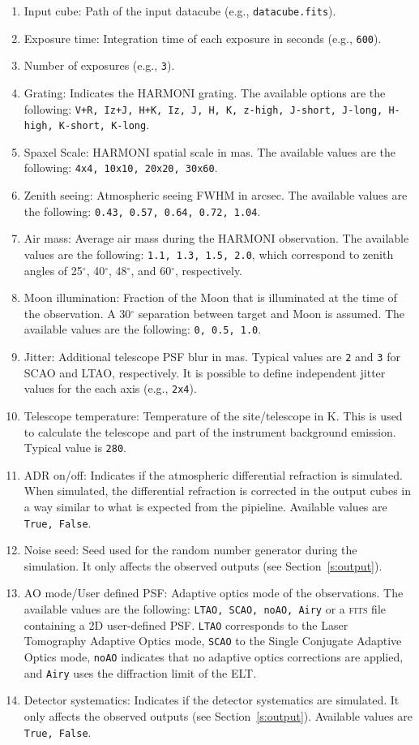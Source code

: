 \documentclass[12pt]{report}
\begin{document}
\begin{enumerate}
\setlength\itemsep{-0.5ex}
\item Input cube: Path of the input datacube (e.g., \texttt{datacube.fits}).
\item Exposure time: Integration time of each exposure in seconds (e.g., \texttt{600}).
\item Number of exposures (e.g., \texttt{3}).
\item Grating: Indicates the HARMONI grating. The available options are the following: \texttt{V+R, Iz+J, H+K, Iz, J, H, K, z-high, J-short, J-long, H-high, K-short, K-long}.
\item Spaxel Scale: HARMONI spatial scale in mas. The available values are the following: \texttt{4x4, 10x10, 20x20, 30x60}.
\item Zenith seeing: Atmospheric seeing FWHM in arcsec. The available values are the following: \texttt{0.43, 0.57, 0.64, 0.72, 1.04}.
\item Air mass: Average air mass during the HARMONI observation. The available values are the following: \texttt{1.1, 1.3, 1.5, 2.0}, which correspond to zenith angles of 25$^{\circ}$, 40$^{\circ}$, 48$^{\circ}$, and 60$^{\circ}$, respectively.
\item Moon illumination: Fraction of the Moon that is illuminated at the time of the observation. A 30$^{\circ}$ separation between target and Moon is assumed. The available values are the following: \texttt{0, 0.5, 1.0}.
\item Jitter: Additional telescope PSF blur in mas. Typical values are \texttt{2} and \texttt{3} for SCAO and LTAO, respectively. It is possible to define independent jitter values for the each axis (e.g., \texttt{2x4}).
\item Telescope temperature: Temperature of the site\slash telescope in K. This is used to calculate the telescope and part of the instrument background emission. Typical value is \texttt{280}.
\item ADR on/off: Indicates if the atmospheric differential refraction is simulated. When simulated, the differential refraction is corrected in the output cubes in a way similar to what is expected from the pipieline. Available values are \texttt{True, False}.
\item Noise seed: Seed used for the random number generator during the simulation. It only affects the observed outputs (see Section~\ref{s:output}).
\item AO mode/User defined PSF: Adaptive optics mode of the observations. The available values are the following: \texttt{LTAO, SCAO, noAO, Airy} or a \textsc{fits} file containing a 2D user-defined PSF. \texttt{LTAO} corresponds to the Laser Tomography Adaptive Optics mode,  \texttt{SCAO} to the Single Conjugate Adaptive Optics mode, \texttt{noAO} indicates that no adaptive optics corrections are applied, and \texttt{Airy} uses the diffraction limit of the ELT.
\item Detector systematics: Indicates if the detector systematics are simulated. It only affects the observed outputs (see Section~\ref{s:output}). Available values are \texttt{True, False}.
\end{enumerate}
\end{document}
